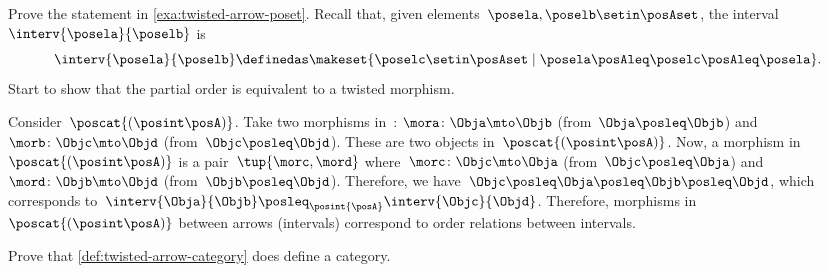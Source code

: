 \begin{exercise}
    Prove the statement in \cref{exa:twisted-arrow-poset}.
    Recall that, given elements~$\posela, \poselb \setin \posAset$, the interval~$\interv{\posela}{\poselb}$ is
    \begin{equation}
        \interv{\posela}{\poselb}
        \definedas \makeset{\poselc \setin \posAset \mid \posela\posAleq \poselc \posAleq \posela}.
    \end{equation}
    Start to show that the partial order is equivalent to a twisted morphism.
\end{exercise}
\begin{solution}
    Consider~$\poscat{\left(\posint\posA\right)}$.
    Take two morphisms in~\posA: $\mora\colon \Obja \mto \Objb$ (from~$\Obja \posleq \Objb$) and $\morb\colon \Objc\mto \Objd$ (from~$\Objc \posleq \Objd$).
    These are two objects in~$\poscat{\left(\posint\posA\right)}$.
    Now, a morphism in~$\poscat{\left(\posint\posA\right)}$ is a pair~$\tup{\morc,\mord}$ where~$\morc\colon \Objc \mto \Obja$ (from~$\Objc\posleq \Obja$) and~$\mord\colon \Objb \mto \Objd$ (from~$\Objb\posleq \Objd$).
    Therefore, we have~$\Objc\posleq \Obja\posleq \Objb\posleq \Objd$, which corresponds to~$\interv{\Obja}{\Objb}\posleq_{\posint{\posA}}\interv{\Objc}{\Objd}$.
    Therefore, morphisms in~$\poscat{\left(\posint\posA\right)}$ between arrows (intervals) correspond to order relations between intervals.
\end{solution}


\vfill

\begin{gradedexercise}
    \label{ex:TwistedCat}
    Prove that \cref{def:twisted-arrow-category} does define a category.
\end{gradedexercise}

